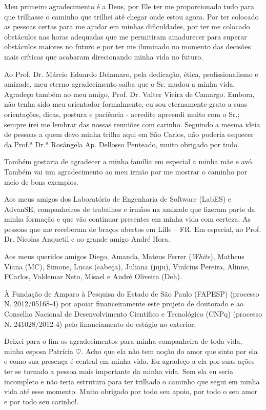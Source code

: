 Meu primeiro agradecimento é a Deus, por Ele ter me proporcionado tudo para que trilhasse o caminho que trilhei até chegar onde estou agora. Por ter colocado as pessoas certas para me ajudar em minhas dificuldades, por ter me colocado obstáculos nas horas adequadas que me permitiram amadurecer para superar obstáculos maiores no futuro e por ter me iluminado no momento das decisões mais críticas que acabaram direcionando minha vida no futuro.

Ao Prof. Dr. Márcio Eduardo Delamaro, pela dedicação, ética, profissionalismo e amizade, meu eterno agradecimento saiba que o Sr. mudou a minha vida. Agradeço também ao meu amigo, Prof. Dr. Valter Vieira de Camargo. Embora, não tenha sido meu orientador formalmente, eu sou eternamente grato a suas orientações, dicas, postura e paciência - acredite apreendi muito com o Sr.; sempre irei me lembrar das nossas reuniões com carinho. Seguindo a mesma ideia de pessoas a quem devo minha trilha aqui em São Carlos, não poderia esquecer da Prof.ª Dr.ª Rosângela Ap. Dellosso Penteado, muito obrigado por tudo.

Também gostaria de agradecer a minha família em especial a minha mãe e avó. Também vai um agradecimento ao meu irmão por me mostrar o caminho por meio de bons exemplos.

Aos meus amigos dos Laboratório de Engenharia de Software (LabES) e AdvanSE, companheiros de trabalhos e irmãos na amizade que fizeram parte da minha formação e que vão continuar presentes em minha vida com certeza. As pessoas que me receberam de braços abertos em Lille – FR. Em especial, ao Prof. Dr. Nicolas Anquetil e ao grande amigo André Hora. 

Aos meus queridos amigos Diego, Amanda, Mateus Ferrer (\textit{White}), Matheus Viana (MC), Simone, Lucas (cabeça), Juliana (juju), Vinícius Pereira, Alinne, FCarlos, Valdemar Neto, Misael e André Oliveira (Deh).

À Fundação de Amparo à Pesquisa do Estado de São Paulo (FAPESP) (processo N. 2012/05168-4) por apoiar financeiramente este projeto de doutorado e ao Conselho Nacional de Desenvolvimento Científico e Tecnológico (CNPq) (processo N. 241028/2012-4) pelo financiamento do estágio no exterior.

Deixei para o fim os agradecimentos para minha companheira de toda vida, minha esposa Patrícia $\heartsuit$. Acho que ela não tem noção do amor que sinto por ela e como sua presença é central em minha vida. Eu agradeço a ela por suas ações ter se tornado a pessoa mais importante da minha vida. Sem ela eu seria incompleto e não teria estrutura para ter trilhado o caminho que segui em minha vida até esse momento. Muito obrigado por todo seu apoio, por todo o seu amor e por todo seu carinho!.

